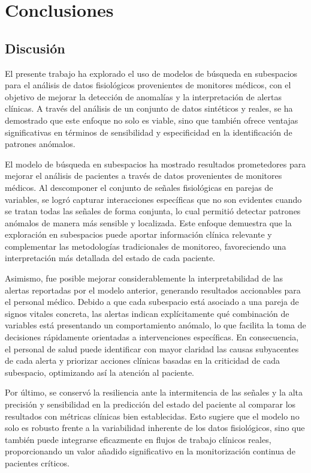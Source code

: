 \chapter{Conclusiones}

\section{Discusión}

El presente trabajo ha explorado el uso de modelos de búsqueda en subespacios para el análisis de datos fisiológicos provenientes de monitores médicos, con el objetivo de mejorar la detección de anomalías y la interpretación de alertas clínicas. A través del análisis de un conjunto de datos sintéticos y reales, se ha demostrado que este enfoque no solo es viable, sino que también ofrece ventajas significativas en términos de sensibilidad y especificidad en la identificación de patrones anómalos.

El modelo de búsqueda en subespacios ha mostrado resultados prometedores para mejorar el análisis de pacientes a través de datos provenientes de monitores médicos. Al descomponer el conjunto de señales fisiológicas en parejas de variables, se logró capturar interacciones específicas que no son evidentes cuando se tratan todas las señales de forma conjunta, lo cual permitió detectar patrones anómalos de manera más sensible y localizada. Este enfoque demuestra que la exploración en subespacios puede aportar información clínica relevante y complementar las metodologías tradicionales de monitoreo, favoreciendo una interpretación más detallada del estado de cada paciente.

Asimismo, fue posible mejorar considerablemente la interpretabilidad de las alertas reportadas por el modelo anterior, generando resultados accionables para el personal médico. Debido a que cada subespacio está asociado a una pareja de signos vitales concreta, las alertas indican explícitamente qué combinación de variables está presentando un comportamiento anómalo, lo que facilita la toma de decisiones rápidamente orientadas a intervenciones específicas. En consecuencia, el personal de salud puede identificar con mayor claridad las causas subyacentes de cada alerta y priorizar acciones clínicas basadas en la criticidad de cada subespacio, optimizando así la atención al paciente.

Por último, se conservó la resiliencia ante la intermitencia de las señales y la alta precisión y sensibilidad en la predicción del estado del paciente al comparar los resultados con métricas clínicas bien establecidas. Esto sugiere que el modelo no solo es robusto frente a la variabilidad inherente de los datos fisiológicos, sino que también puede integrarse eficazmente en flujos de trabajo clínicos reales, proporcionando un valor añadido significativo en la monitorización continua de pacientes críticos.

